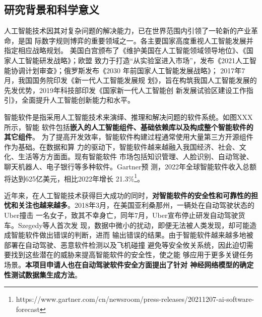 
\subsection{研究背景和科学意义}



人工智能技术因其对复杂问题的解决能力，已在世界范围内引领了一轮新的产业革命，是国
际数字规则博弈的重要领域之一。各主要国家高度重视人工智能发展并指定相应战略规划。
美国白宫颁布了《维护美国在人工智能领域领导地位》、《国家人工智能研发战略》；欧盟
致力于打造“从实验室进入市场”，发布《2021人工智能协调计划审查》；俄罗斯发布《2030
年前国家人工智能发展战略》； 2017年7月，我国国务院印发《新一代人工智能发展规
划》，旨在构筑我国人工智能发展的先发优势，2019年科技部印发《国家新一代人工智能创
新发展试验区建设工作指引》，全面提升人工智能创新能力和水平。

智能软件是指采用人工智能技术来演绎、推理和解决问题的软件系统。如图XXX所示，智能
软件包括\textbf{嵌入的人工智能组件、基础依赖库以及构成整个智能软件的其它组件}。
为了提高开发效率，智能软件构建过程通常使用大量第三方开源组件作为基础。在数据和算
力的驱动下，智能软件越来越融入我国经济、社会、文化、生活等方方面面。现有智能软件
市场包括知识管理、人脸识别、自动驾驶、聊天机器人、电子银行等多种软件。Gartner预
测，2022年全球智能软件收入总额将达到625亿美元，相比2022年增长
21.3\%\footnote{https://www.gartner.com/cn/newsroom/press-releases/20211207-ai-software-forecast}。

近年来，在人工智能技术获得巨大成功的同时，\textbf{对智能软件的安全性和可靠性的担
忧和关注也越来越多}。2018年3月，在美国亚利桑那州，一辆处在自动驾驶状态的Uber撞击
一名女子，致其不幸身亡，同年7月，Uber宣布停止研发自动驾驶货车。Szegedy等人首次发
现，数据中微小的扰动，即便无法被人类发现，却可能造成智能软件做出错误的判断，进而
输出错误的结果。由于智能软件越来越多地被部署在自动驾驶、恶意软件检测以及飞机碰撞
避免等安全攸关系统，因此迫切需要找到这些潜在的威胁来提高智能软件的安全性，使之能
够应用于更多关键任务场景。\textbf{本项目申请人也在自动驾驶软件安全方面提出了针对
神经网络模型的确定性测试数据集生成方法}。 


